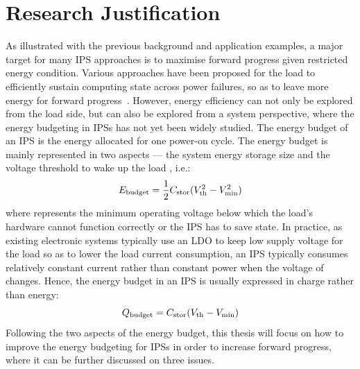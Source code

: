 \section{Research Justification}


As illustrated with the previous background and application examples, a major target for many IPS approaches is to maximise forward progress given restricted energy condition. 
Various approaches have been proposed for the load to efficiently sustain computing state across power failures, so as to leave more energy for forward progress~\cite{maeng2017alpaca, sliper2019efficient, ahmed2019efficient, daulby2020improving, liu2020latics, zhang2021intermittent}. 
However, energy efficiency can not only be explored from the load side, but can also be explored from a system perspective, where the energy budgeting in IPSs has not yet been widely studied. 
The energy budget of an IPS is the energy allocated for one power-on cycle.
The energy budget is mainly represented in two aspects --- the system energy storage size  and the voltage threshold to wake up the load , i.e.:
\begin{equation}
    E_{\text{budget}} = \frac{1}{2}C_{\text{stor}}(V_{\text{th}} ^ 2 - V_{\text{min}} ^ 2)
\end{equation}
where  represents the minimum operating voltage below which the load's hardware cannot function correctly or the IPS has to save state.
In practice, as existing electronic systems typically use an LDO to keep low supply voltage for the load so as to lower the load current consumption, an IPS typically consumes relatively constant current rather than constant power when the voltage of  changes. 
Hence, the energy budget in an IPS is usually expressed in charge rather than energy:
\begin{equation}
    Q_{\text{budget}} = C_{\text{stor}}(V_{\text{th}} - V_{\text{min}})
\end{equation}
Following the two aspects of the energy budget, this thesis will focus on how to improve the energy budgeting for IPSs in order to increase forward progress, where it can be further discussed on three issues. 

